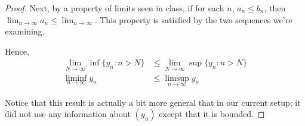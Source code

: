 \documentclass[11pt,letterpaper]{article}
\begin{document}
\begin{proof}
  Next, by a property of limits seen in class, if for each $n$, $a_n \leq b_n$,
  then $\lim_{n\to\infty} a_n \leq \lim_{n\to\infty}$. This property is
  satisfied by the two sequences we're examining.

  Hence,
  \begin{align*}
    \lim_{N\to\infty} \inf \{ y_n : n > N \} &\leq
    \lim_{N\to\infty} \sup \{ y_n : n > N \} \\
    \liminf_{n\to\infty} y_n &\leq \limsup_{n\to\infty} y_n
  \end{align*}

  Notice that this result is actually a bit more general that in our current
  setup; it did not use any information about $(y_n)$ except that it is
  bounded.
\end{proof}
\end{document}
